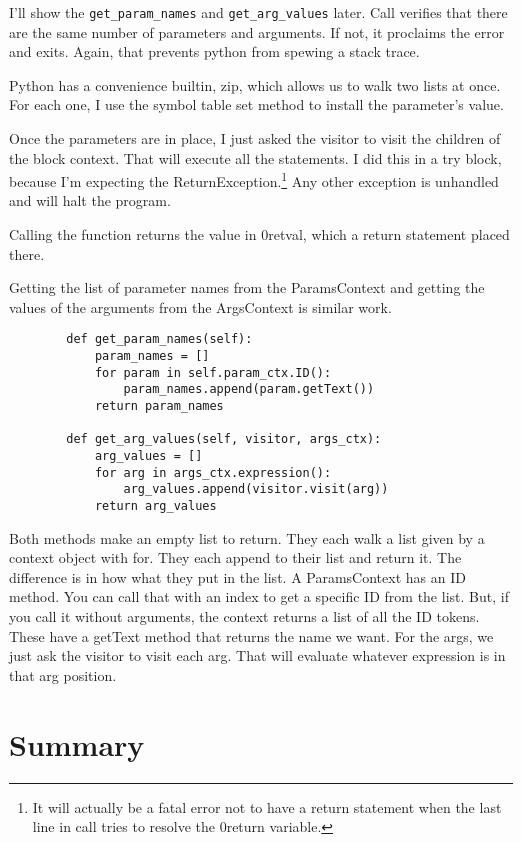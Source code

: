 I'll show the \verb+get_param_names+ and \verb+get_arg_values+ later.
Call verifies
that there are the same number of parameters and arguments. If not,
it proclaims the error and exits. Again, that prevents python from
spewing a stack trace.

Python has a convenience builtin, zip, which allows us to walk
two lists at once. For each one, I use the symbol table set method
to install the parameter's value.

Once the parameters are in place, I just asked the visitor to
visit the children of the block context. That will execute all the
statements. I did this in a try block, because I'm expecting the
ReturnException.\footnote{It will actually be a fatal error not
to have a return statement when the last line in call tries to
resolve the 0return variable.} Any other exception is unhandled
and will halt the program.

Calling the function returns the value in 0retval, which a
return statement placed there.

Getting the list of parameter names from the ParamsContext and
getting the values of the arguments from the ArgsContext is similar work.

{\footnotesize
\begin{verbatim}
        def get_param_names(self):
            param_names = []
            for param in self.param_ctx.ID():
                param_names.append(param.getText())
            return param_names

        def get_arg_values(self, visitor, args_ctx):
            arg_values = []
            for arg in args_ctx.expression():
                arg_values.append(visitor.visit(arg))
            return arg_values
\end{verbatim}
}

Both methods make an empty list to return. They each walk a list
given by a context object with for. They each append to their list and
return it. The difference is in how what they put in the list.
A ParamsContext has an ID method. You can call that with an index to
get a specific ID from the list. But, if you call it without arguments,
the context returns a list of all the ID tokens. These have a getText
method that returns the name we want. For the args, we just ask
the visitor to visit each arg. That will evaluate whatever expression
is in that arg position.

\section{Summary}

